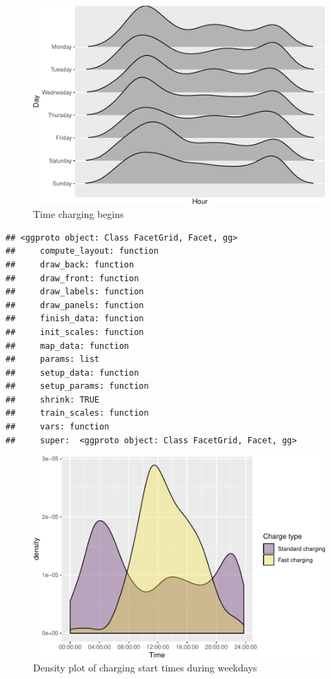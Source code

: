 \documentclass[]{article}
\begin{document}
\begin{figure}
\centering
\includegraphics{EVBB_report_files/figure-latex/ggjoyplotTimeChargingBegins-1.pdf}
\caption{\label{fig:ggjoyplotTimeChargingBegins}Time charging begins}
\end{figure}

\begin{verbatim}
## <ggproto object: Class FacetGrid, Facet, gg>
##     compute_layout: function
##     draw_back: function
##     draw_front: function
##     draw_labels: function
##     draw_panels: function
##     finish_data: function
##     init_scales: function
##     map_data: function
##     params: list
##     setup_data: function
##     setup_params: function
##     shrink: TRUE
##     train_scales: function
##     vars: function
##     super:  <ggproto object: Class FacetGrid, Facet, gg>
\end{verbatim}

\begin{figure}
\centering
\includegraphics{EVBB_report_files/figure-latex/chargeBeginsWeekday-1.pdf}
\caption{\label{fig:chargeBeginsWeekday}Density plot of charging start times
during weekdays}
\end{figure}
\end{document}
